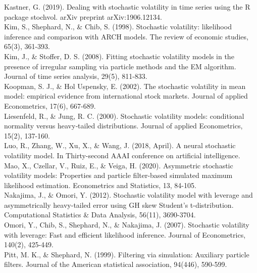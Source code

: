 \documentclass[
]{book}
\theoremstyle{break}
\theoremstyle{nonumberplain}
\begin{document}
Kastner, G. (2019). Dealing with stochastic volatility in time series
using the R package stochvol. arXiv preprint arXiv:1906.12134.\\

Kim, S., Shephard, N., \& Chib, S. (1998). Stochastic volatility:
likelihood inference and comparison with ARCH models. The review of
economic studies, 65(3), 361-393.\\

Kim, J., \& Stoffer, D. S. (2008). Fitting stochastic volatility models
in the presence of irregular sampling via particle methods and the EM
algorithm. Journal of time series analysis, 29(5), 811-833.\\

Koopman, S. J., \& Hol Uspensky, E. (2002). The stochastic volatility in
mean model: empirical evidence from international stock markets. Journal
of applied Econometrics, 17(6), 667-689.\\

Liesenfeld, R., \& Jung, R. C. (2000). Stochastic volatility models:
conditional normality versus heavy‐tailed distributions. Journal of
applied Econometrics, 15(2), 137-160.\\

Luo, R., Zhang, W., Xu, X., \& Wang, J. (2018, April). A neural
stochastic volatility model. In Thirty-second AAAI conference on
artificial intelligence.\\

Mao, X., Czellar, V., Ruiz, E., \& Veiga, H. (2020). Asymmetric
stochastic volatility models: Properties and particle filter-based
simulated maximum likelihood estimation. Econometrics and Statistics,
13, 84-105.\\

Nakajima, J., \& Omori, Y. (2012). Stochastic volatility model with
leverage and asymmetrically heavy-tailed error using GH skew Student's
t-distribution. Computational Statistics \& Data Analysis, 56(11),
3690-3704.\\

Omori, Y., Chib, S., Shephard, N., \& Nakajima, J. (2007). Stochastic
volatility with leverage: Fast and efficient likelihood inference.
Journal of Econometrics, 140(2), 425-449.\\

Pitt, M. K., \& Shephard, N. (1999). Filtering via simulation: Auxiliary
particle filters. Journal of the American statistical association,
94(446), 590-599.\\
\end{document}
